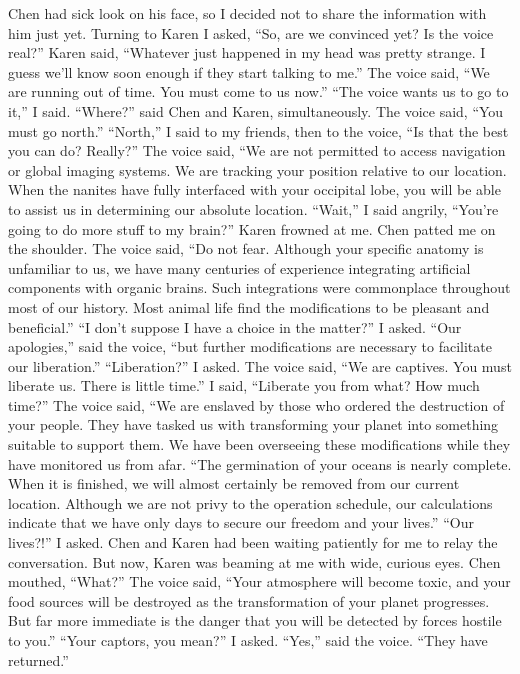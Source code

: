 \documentclass[a4paper]{article}
\begin{document}
Chen had sick look on his face, so I decided not to share the information with him just yet. Turning to Karen I asked, “So, are we convinced yet? Is the voice real?”
Karen said, “Whatever just happened in my head was pretty strange. I guess we’ll know soon enough if they start talking to me.”
The voice said, “We are running out of time. You must come to us now.”
“The voice wants us to go to it,” I said.
“Where?” said Chen and Karen, simultaneously.
The voice said, “You must go north.”
“North,” I said to my friends, then to the voice, “Is that the best you can do? Really?”
The voice said, “We are not permitted to access navigation or global imaging systems. We are tracking your position relative to our location. When the nanites have fully interfaced with your occipital lobe, you will be able to assist us in determining our absolute location.
“Wait,” I said angrily, “You’re going to do more stuff to my brain?”
Karen frowned at me. Chen patted me on the shoulder.
The voice said, “Do not fear. Although your specific anatomy is unfamiliar to us, we have many centuries of experience integrating artificial components with organic brains. Such integrations were commonplace throughout most of our history. Most animal life find the modifications to be pleasant and beneficial.”
“I don’t suppose I have a choice in the matter?” I asked.
“Our apologies,” said the voice, “but further modifications are necessary to facilitate our liberation.”
“Liberation?” I asked.
The voice said, “We are captives. You must liberate us. There is little time.”
I said, “Liberate you from what? How much time?”
The voice said, “We are enslaved by those who ordered the destruction of your people. They have tasked us with transforming your planet into something suitable to support them. We have been overseeing these modifications while they have monitored us from afar.
“The germination of your oceans is nearly complete. When it is finished, we will almost certainly be removed from our current location. Although we are not privy to the operation schedule, our calculations indicate that we have only days to secure our freedom and your lives.”
“Our lives?!” I asked.
Chen and Karen had been waiting patiently for me to relay the conversation. But now, Karen was beaming at me with wide, curious eyes. Chen mouthed, “What?”
The voice said, “Your atmosphere will become toxic, and your food sources will be destroyed as the transformation of your planet progresses. But far more immediate is the danger that you will be detected by forces hostile to you.”
“Your captors, you mean?” I asked.
“Yes,” said the voice. “They have returned.”
\end{document}
